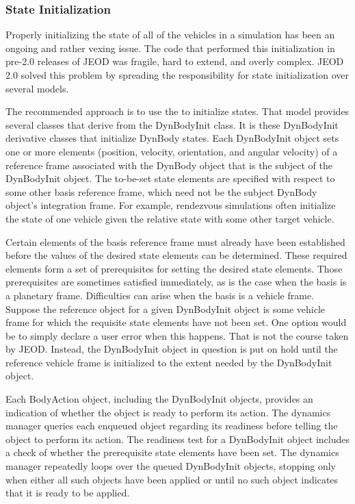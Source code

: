 \subsubsection{State Initialization}\label{sec:key_state_initialization}
Properly initializing the state of all of the vehicles in a simulation
has been an ongoing and rather vexing issue.
The code that performed this initialization in pre-2.0 releases of JEOD was
fragile, hard to extend, and overly complex. JEOD 2.0 solved this problem by
spreading the responsibility for state initialization over several models.

The recommended approach is to use the \BODYACTION to initialize states.
That model provides several classes that derive from the DynBodyInit class.
It is these DynBodyInit derivative classes that initialize DynBody states.
Each DynBodyInit object sets one or more elements (position, velocity,
orientation, and angular velocity) of a reference frame associated with the
DynBody object that is the subject of the DynBodyInit object.
The to-be-set state elements are specified with respect to some other
basis reference frame, which need not be the subject DynBody object's
integration frame. For example, rendezvous simulations often initialize the
state of one vehicle given the relative state with some other target vehicle.

Certain elements of the basis reference frame must already have been
established before the values of the desired state elements can be determined.
These required elements form a set of prerequisites for setting the desired
state elements. Those prerequisites are sometimes satisfied immediately, as is
the case when the basis is a planetary frame. Difficulties can arise when the
basis is a vehicle frame. Suppose the reference object for a given
DynBodyInit object is some vehicle frame for which the requisite state elements
have not been set. One option would be to simply declare a user error when this
happens. That is not the course taken by JEOD.
Instead, the DynBodyInit object in question is put on hold until the reference
vehicle frame is initialized to the extent needed by the DynBodyInit object.

Each BodyAction object, including the DynBodyInit objects, provides an
indication of whether the object is ready to perform its action. The dynamics
manager queries each enqueued object regarding its readiness before telling
the object to perform its action. The readiness test for a DynBodyInit object
includes a check of whether the prerequisite state elements have been set.
The dynamics manager repeatedly loops over the queued DynBodyInit objects,
stopping only when either all such objects have been applied or until
no such object indicates that it is ready to be applied.


